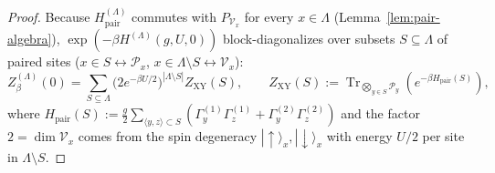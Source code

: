 \documentclass[11pt]{article}
\theoremstyle{definition}
\theoremstyle{remark}
\DeclareMathOperator{\Tr}{Tr}
\newcommand{\calP}{\mathcal{P}}
\newcommand{\calV}{\mathcal{V}}
\begin{document}
\begin{proof}
Because $H_{\mathrm{pair}}^{(\Lambda)}$ commutes with $P_{\calV_x}$ for every $x \in \Lambda$ (Lemma~\ref{lem:pair-algebra}), $\exp(-\beta H^{(\Lambda)}(g, U, 0))$ block-diagonalizes over subsets $S \subseteq \Lambda$ of paired sites ($x \in S \leftrightarrow \calP_x$, $x \in \Lambda \setminus S \leftrightarrow \calV_x$):
\begin{equation}\label{eq:Z-decomp}
Z_\beta^{(\Lambda)}(0) = \sum_{S \subseteq \Lambda} \bigl(2 e^{-\beta U/2}\bigr)^{|\Lambda \setminus S|} Z_{\mathrm{XY}}(S), \qquad Z_{\mathrm{XY}}(S) := \Tr_{\bigotimes_{y \in S}\calP_y}\!\left(e^{-\beta H_{\mathrm{pair}}(S)}\right),
\end{equation}
where $H_{\mathrm{pair}}(S) := \frac{g}{2}\sum_{\langle y, z\rangle \subset S} (\Gamma_y^{(1)}\Gamma_z^{(1)} + \Gamma_y^{(2)}\Gamma_z^{(2)})$ and the factor $2 = \dim \calV_x$ comes from the spin degeneracy $|\uparrow\rangle_x, |\downarrow\rangle_x$ with energy $U/2$ per site in $\Lambda \setminus S$.


\end{proof}
\end{document}
